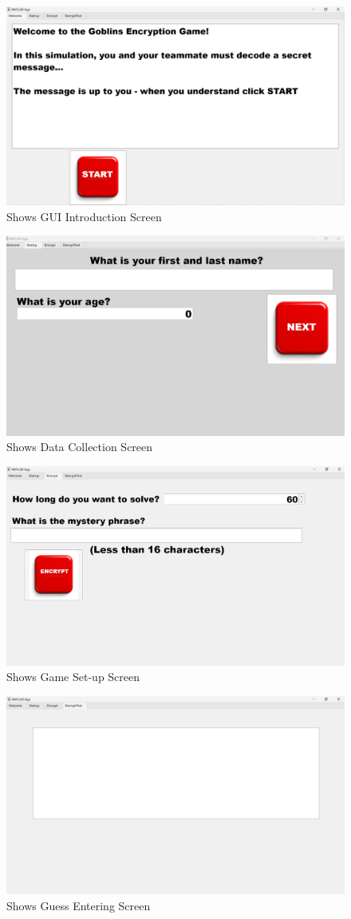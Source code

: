 \documentclass[conference]{IEEEtran}
\begin{document}
 \begin{figure}[H]
   \centering
   \includegraphics[width=.75\textwidth]{Figures/Log/PhotoLog9.png}
   \caption{Shows GUI Introduction Screen}
 \end{figure}
 \begin{figure}[H]
   \centering
   \includegraphics[width=.75\textwidth]{Figures/Log/PhotoLog10.png}
   \caption{Shows Data Collection Screen}
 \end{figure}
 \begin{figure}[H]
   \centering
   \includegraphics[width=.75\textwidth]{Figures/Log/PhotoLog11.png}
   \caption{Shows Game Set-up Screen}
 \end{figure}
 \begin{figure}[H]
   \centering
   \includegraphics[width=.75\textwidth]{Figures/Log/PhotoLog12.png}
   \caption{Shows Guess Entering Screen}
 \end{figure}
\end{document}
